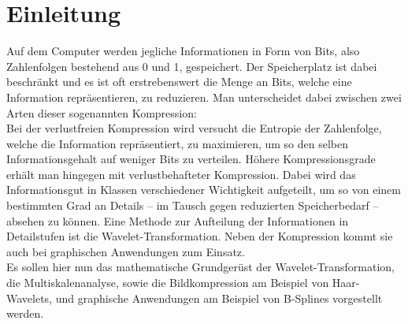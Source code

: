 \section{Einleitung}
%
Auf dem Computer werden jegliche Informationen in Form von Bits, also Zahlenfolgen bestehend aus 0 und 1, gespeichert. Der Speicherplatz ist dabei beschränkt und es ist oft erstrebenswert die Menge an Bits, welche eine Information repräsentieren, zu reduzieren. Man unterscheidet dabei zwischen zwei Arten dieser sogenannten Kompression:\\
Bei der verlustfreien Kompression wird versucht die Entropie der Zahlenfolge, welche die Information repräsentiert, zu maximieren, um so den selben Informationsgehalt auf weniger Bits zu verteilen.
Höhere Kompressionsgrade erhält man hingegen mit verlustbehafteter Kompression. Dabei wird das Informationsgut in Klassen verschiedener Wichtigkeit aufgeteilt, um so von einem bestimmten Grad an Details -- im Tausch gegen reduzierten Speicherbedarf -- absehen zu können. Eine Methode zur Aufteilung der Informationen in Detailstufen ist die Wavelet-Transformation. Neben der Kompression kommt sie auch bei graphischen Anwendungen zum Einsatz.\\
Es sollen hier nun das mathematische Grundgerüst der Wavelet-Transformation, die Multiskalenanalyse, sowie die Bildkompression am Beispiel von Haar-Wavelets, und graphische Anwendungen am Beispiel von B-Splines vorgestellt werden.